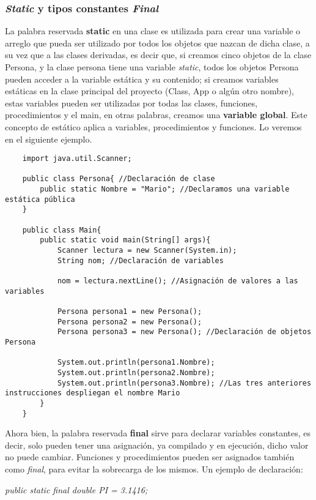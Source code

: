 \subsubsection{\textit{Static} y tipos constantes \textit{Final}}
La palabra reservada \textbf{static} en una clase es utilizada para crear una variable o arreglo que pueda ser utilizado por todos los objetos que nazcan de dicha clase, a su vez que a las clases derivadas, es decir que, si creamos cinco objetos de la clase Persona, y la clase persona tiene una variable \textit{static}, todos los objetos Persona pueden acceder a la variable estática y su contenido; si creamos variables estáticas en la clase principal del proyecto (Class, App o algún otro nombre), estas variables pueden ser utilizadas por todas las clases, funciones, procedimientos y el main, en otras palabras, creamos una \textbf{variable global}. Este concepto de estático aplica a variables, procedimientos y funciones. Lo veremos en el siguiente ejemplo.
\begin{lstlisting}
    import java.util.Scanner;
    
    public class Persona{ //Declaración de clase
        public static Nombre = "Mario"; //Declaramos una variable estática pública
    }
    
    public class Main{
        public static void main(String[] args){
            Scanner lectura = new Scanner(System.in);
            String nom; //Declaración de variables
            
            nom = lectura.nextLine(); //Asignación de valores a las variables
            
            Persona persona1 = new Persona();
            Persona persona2 = new Persona();
            Persona persona3 = new Persona(); //Declaración de objetos Persona
            
            System.out.println(persona1.Nombre);
            System.out.println(persona2.Nombre);
            System.out.println(persona3.Nombre); //Las tres anteriores instrucciones despliegan el nombre Mario
        }
    }
\end{lstlisting}
Ahora bien, la palabra reservada \textbf{final} sirve para declarar variables constantes, es decir, solo pueden tener una asignación, ya compilado y en ejecución, dicho valor no puede cambiar. Funciones y procedimientos pueden ser asignados también como \textit{final}, para evitar la sobrecarga de los mismos. Un ejemplo de declaración:\begin{center}\textit{public static final double PI = 3.1416;}\end{center}

